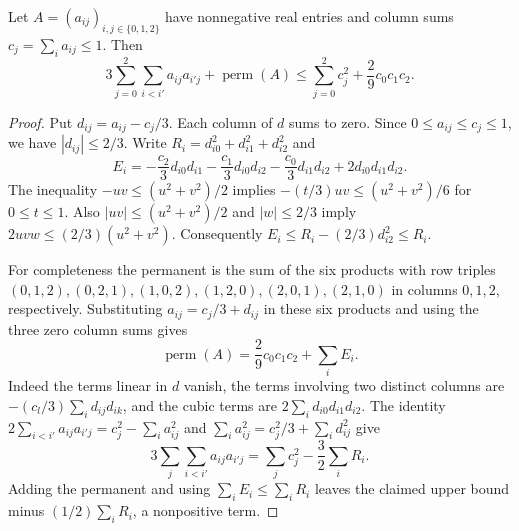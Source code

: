 \begin{lemma}
Let $A=(a_{ij})_{i,j\in\{0,1,2\}}$ have nonnegative real entries and
column sums $c_j=\sum_i a_{ij}\le1$. Then
\[
3\sum_{j=0}^2\sum_{i<i'}a_{ij}a_{i'j}+\operatorname{perm}(A)
\le \sum_{j=0}^2 c_j^2+\frac29c_0c_1c_2.
\]
\end{lemma}
\begin{proof}
Put $d_{ij}=a_{ij}-c_j/3$. Each column of $d$ sums to zero.
Since $0\le a_{ij}\le c_j\le1$, we have $|d_{ij}|\le2/3$.
Write $R_i=d_{i0}^2+d_{i1}^2+d_{i2}^2$ and
\[
E_i=-\frac{c_2}{3}d_{i0}d_{i1}-\frac{c_1}{3}d_{i0}d_{i2}
-\frac{c_0}{3}d_{i1}d_{i2}+2d_{i0}d_{i1}d_{i2}.
\]
The inequality $-uv\le(u^2+v^2)/2$ implies
$-(t/3)uv\le(u^2+v^2)/6$ for $0\le t\le1$.
Also $|uv|\le(u^2+v^2)/2$ and $|w|\le2/3$ imply
$2uvw\le(2/3)(u^2+v^2)$. Consequently
$E_i\le R_i-(2/3)d_{i2}^2\le R_i$.

For completeness the permanent is the sum of the six products with row
triples $(0,1,2),(0,2,1),(1,0,2),(1,2,0),(2,0,1),(2,1,0)$
in columns $0,1,2$, respectively. Substituting $a_{ij}=c_j/3+d_{ij}$
in these six products and using the three zero column sums gives
\[
\operatorname{perm}(A)=\frac29c_0c_1c_2+\sum_i E_i.
\]
Indeed the terms linear in $d$ vanish, the terms involving two distinct
columns are $-(c_l/3)\sum_i d_{ij}d_{ik}$, and the cubic terms are
$2\sum_i d_{i0}d_{i1}d_{i2}$.
The identity $2\sum_{i<i'}a_{ij}a_{i'j}=c_j^2-\sum_i a_{ij}^2$
and $\sum_i a_{ij}^2=c_j^2/3+\sum_i d_{ij}^2$ give
\[
3\sum_j\sum_{i<i'}a_{ij}a_{i'j}=\sum_j c_j^2-\frac32\sum_i R_i.
\]
Adding the permanent and using $\sum_i E_i\le\sum_i R_i$ leaves
the claimed upper bound minus $(1/2)\sum_i R_i$, a nonpositive term.
\end{proof}
